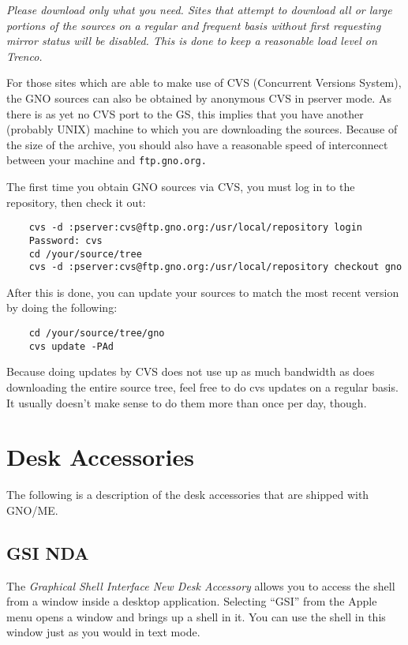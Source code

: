 \documentclass{report}
\begin{document}
\em Please download only what you need.  Sites that attempt to download
all or large portions of the sources on a regular and frequent basis
without first requesting mirror status will be disabled. This is done
to keep a reasonable load level on Trenco.\rm

For those sites which are able to make use of CVS (Concurrent Versions
System), the GNO sources can also be obtained by anonymous CVS in 
pserver mode.  As there is as yet no CVS port to the GS, this implies
that you have another (probably UNIX) machine to which you are downloading
the sources.  Because of the size of the archive, you should also have
a reasonable speed of interconnect between your machine and \tt ftp.gno.org\rm.

The first time you obtain GNO sources via CVS, you must log in to the
repository, then check it out:

\begin{verbatim}
	cvs -d :pserver:cvs@ftp.gno.org:/usr/local/repository login
	Password: cvs
	cd /your/source/tree
	cvs -d :pserver:cvs@ftp.gno.org:/usr/local/repository checkout gno
\end{verbatim}

After this is done, you can update your sources to match the most recent
version by doing the following:

\begin{verbatim}
	cd /your/source/tree/gno
	cvs update -PAd
\end{verbatim}

Because doing updates by CVS does not use up as much bandwidth as 
does downloading the entire source tree, feel free to do cvs updates
on a regular basis.  It usually doesn't make sense to do them more
than once per day, though.

\chapter{Desk Accessories}

The following is a description of the desk
accessories that are shipped with GNO/ME.

\section{GSI NDA}

The \textit{Graphical Shell Interface New Desk Accessory}
allows you to access the shell from a window inside a
desktop application. Selecting ``GSI'' from the Apple menu opens a
window and brings up a shell in it. You can use the shell in this
window just as you would in text mode.
\end{document}
